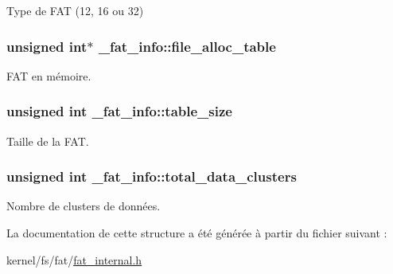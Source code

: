 Type de F\+A\+T (12, 16 ou 32) \hypertarget{struct__fat__info_a27195d09eb1dcd65d35d7b312d1bec0b}{
\subsubsection[{file\+\_\+alloc\+\_\+table}]{\setlength{\rightskip}{0pt plus 5cm}unsigned int$\ast$ \+\_\+fat\+\_\+info\+::file\+\_\+alloc\+\_\+table}}\label{struct__fat__info_a27195d09eb1dcd65d35d7b312d1bec0b}
F\+A\+T en mémoire. \hypertarget{struct__fat__info_af110757af771c0f3fe0c515cca1ff177}{
\subsubsection[{table\+\_\+size}]{\setlength{\rightskip}{0pt plus 5cm}unsigned int \+\_\+fat\+\_\+info\+::table\+\_\+size}}\label{struct__fat__info_af110757af771c0f3fe0c515cca1ff177}
Taille de la F\+A\+T. \hypertarget{struct__fat__info_ab43681d4b5c7cf719cd6c934cada39e3}{
\subsubsection[{total\+\_\+data\+\_\+clusters}]{\setlength{\rightskip}{0pt plus 5cm}unsigned int \+\_\+fat\+\_\+info\+::total\+\_\+data\+\_\+clusters}}\label{struct__fat__info_ab43681d4b5c7cf719cd6c934cada39e3}
Nombre de clusters de données. 

La documentation de cette structure a été générée à partir du fichier suivant \+:\begin{DoxyCompactItemize}
\item 
kernel/fs/fat/\hyperlink{fat__internal_8h}{fat\+\_\+internal.\+h}\end{DoxyCompactItemize}
